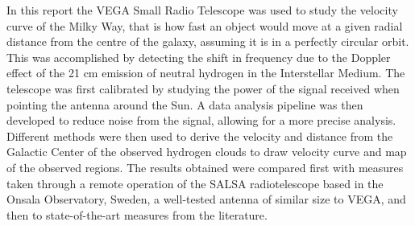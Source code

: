 In this report the VEGA Small Radio Telescope was used to study the velocity curve of the Milky Way, that is how
fast an object would move at a given radial distance from the centre
of the galaxy, assuming it is in a perfectly circular orbit.
This was accomplished by detecting the shift in frequency due to the Doppler effect of the 21 cm emission of neutral hydrogen in the Interstellar Medium.
The telescope was first calibrated by studying the power of the signal received when pointing the antenna around the Sun.
A data analysis pipeline was then developed to {reduce} noise from the signal, {allowing for a more precise analysis}.
Different methods were then used to derive the velocity and distance from the Galactic Center of the observed hydrogen clouds to draw velocity curve and map of the observed regions.
The results obtained were compared first with measures taken through a remote operation of the SALSA radiotelescope based in the Onsala Observatory, Sweden, a well-tested antenna of similar size to VEGA, and then to state-of-the-art measures from the literature.


